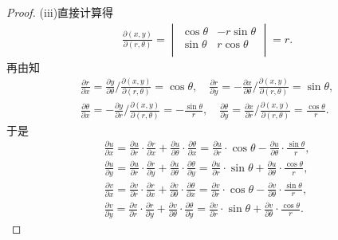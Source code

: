 \documentclass[../../main.tex]{subfiles}%
\begin{document}
\begin{proof}
(iii)直接计算得
\begin{align*}
\frac{\partial \left( x,y \right)}{\partial \left( r,\theta \right)}=\begin{vmatrix}
\cos \theta& -r\sin \theta\\
\sin \theta& r\cos \theta\\
\end{vmatrix}=r.
\end{align*}
再由知
\begin{align*}
\frac{\partial r}{\partial x}=\frac{\partial y}{\partial \theta}\bigg/\frac{\partial \left( x,y \right)}{\partial \left( r,\theta \right)}=\cos \theta,\quad \frac{\partial r}{\partial y}=-\frac{\partial x}{\partial \theta}\bigg/\frac{\partial \left( x,y \right)}{\partial \left( r,\theta \right)}=\sin \theta,\\
\frac{\partial \theta}{\partial x}=-\frac{\partial y}{\partial r}\bigg/\frac{\partial \left( x,y \right)}{\partial \left( r,\theta \right)}=-\frac{\sin \theta}{r},\quad \frac{\partial \theta}{\partial y}=\frac{\partial x}{\partial r}\bigg/\frac{\partial \left( x,y \right)}{\partial \left( r,\theta \right)}=\frac{\cos \theta}{r}.
\end{align*}
于是
\begin{gather*}
\frac{\partial u}{\partial x}=\frac{\partial u}{\partial r}\cdot \frac{\partial r}{\partial x}+\frac{\partial u}{\partial \theta}\cdot \frac{\partial \theta}{\partial x}=\frac{\partial u}{\partial r}\cdot \cos \theta -\frac{\partial u}{\partial \theta}\cdot \frac{\sin \theta}{r},
\\
\frac{\partial u}{\partial y}=\frac{\partial u}{\partial r}\cdot \frac{\partial r}{\partial y}+\frac{\partial u}{\partial \theta}\cdot \frac{\partial \theta}{\partial y}=\frac{\partial u}{\partial r}\cdot \sin \theta +\frac{\partial u}{\partial \theta}\cdot \frac{\cos \theta}{r},
\\
\frac{\partial v}{\partial x}=\frac{\partial v}{\partial r}\cdot \frac{\partial r}{\partial x}+\frac{\partial v}{\partial \theta}\cdot \frac{\partial \theta}{\partial x}=\frac{\partial v}{\partial r}\cdot \cos \theta -\frac{\partial v}{\partial \theta}\cdot \frac{\sin \theta}{r},
\\
\frac{\partial v}{\partial y}=\frac{\partial v}{\partial r}\cdot \frac{\partial r}{\partial y}+\frac{\partial v}{\partial \theta}\cdot \frac{\partial \theta}{\partial y}=\frac{\partial v}{\partial r}\cdot \sin \theta +\frac{\partial v}{\partial \theta}\cdot \frac{\cos \theta}{r}.

\end{gather*}
\end{proof}
\end{document}
